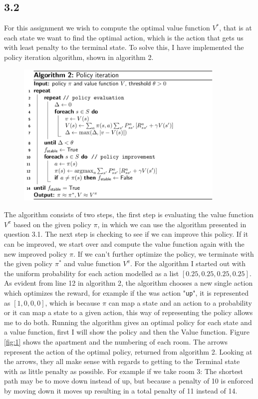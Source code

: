 \documentclass{article}
\begin{document}
\subsection{3.2}
For this assignment we wish to compute the optimal value function $V^*$, that is at each state we want to find the optimal action, which is the action that gets us with least penalty to the terminal state. To solve this, I have implemented the policy iteration algorithm, shown in algorithm 2.
\begin{figure}[H]
  \includegraphics[width=10cm]{fig/5.png}
\end{figure}
The algorithm consists of two steps, the first step is evaluating the value function $V^\pi$ based on the given policy $\pi$, in which we can use the algorithm presented in question 3.1. The next step is checking to see if we can improve this policy. If it can be improved, we start over and compute the value function again with the new improved policy $\pi$. If we can't further optimize the policy, we terminate with the given policy $\pi^*$ and value function $V^\pi$. For the algorithm I started out with the uniform probability for each action modelled as a list $[0.25, 0.25, 0.25, 0.25]$. As evident from line 12 in algorithm 2, the algorithm chooses a new single action which optimizes the reward, for example if the was action "\texttt{up}", it is represented as $[1,0,0,0]$, which is because $\pi$ can map a state and an action to a probability or it can map a state to a given action, this way of representing the policy allows me to do both. Running the algorithm gives an optimal policy for each state and a value function, first I will show the policy and then the Value function. 
Figure \ref{fig:1} shows the apartment and the numbering of each room. The arrows represent the action of the optimal policy, returned from algorithm 2. Looking at the arrows, they all make sense with regards to getting to the Terminal state with as little penalty as possible. For example if we take room 3: The shortest path may be to move down instead of up, but because a penalty of 10 is enforced by moving down it moves up resulting in a total penalty of 11 instead of 14.
\end{document}
